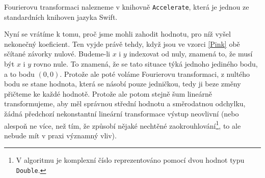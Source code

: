 Fourierovu transformaci nalezneme v knihovně {\tt Accelerate}, která je jednou ze
standardních knihoven jazyka Swift.

Nyní se vrátíme k tomu, proč jsme mohli zahodit hodnotu, pro níž vyšel
nekonečný koeficient. Ten vyjde právě tehdy, když jsou ve vzorci \eqref{Pink}
obě sčítané závorky nulové. Budeme-li $x$ i $y$ indexovat od nuly, znamená to,
že musí být $x$ i $y$ rovno nule. To znamená, že se tato situace týká jednoho
jediného bodu, a to bodu $(0,0)$. Protože ale poté voláme Fourierovu
transformaci, z nultého bodu se stane hodnota, která se násobí pouze jedničkou,
tedy ji beze změny přičteme ke každé hodnotě. Protože ale potom stejně šum
lineárně transformujeme, aby měl správnou střední hodnotu a směrodatnou
odchylku, žádná předchozí nekonstantní lineární transformace výstup neovlivní
(nebo alespoň ne více, než tím, že způsobí nějaké nechtěné
zaokrouhlování\footnote{V algoritmu je komplexní číslo reprezentováno pomocí
dvou hodnot typu {\tt Double}.}, to ale nebude mít v praxi významný vliv).
